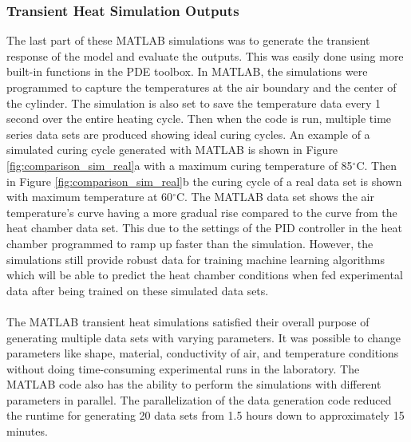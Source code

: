\subsubsection{Transient Heat Simulation Outputs}
The last part of these MATLAB simulations was to generate the transient response of the model and evaluate the outputs. This was easily done using more built-in functions in the PDE toolbox. In MATLAB, the simulations were programmed to capture the temperatures at the air boundary and the center of the cylinder. The simulation is also set to save the temperature data every 1 second over the entire heating cycle. Then when the code is run, multiple time series data sets are produced showing ideal curing cycles. An example of a simulated curing cycle generated with MATLAB is shown in Figure \ref{fig:comparison_sim_real}a with a maximum curing temperature of 85$^\circ$C. Then in Figure \ref{fig:comparison_sim_real}b the curing cycle of a real data set is shown with maximum temperature at 60$^\circ$C. The MATLAB data set shows the air temperature’s curve having a more gradual rise compared to the curve from the heat chamber data set. This due to the settings of the PID controller in the heat chamber programmed to ramp up faster than the simulation. However, the simulations still provide robust data for training machine learning algorithms which will be able to predict the heat chamber conditions when fed experimental data after being trained on these simulated data sets.\\\\
The MATLAB transient heat simulations satisfied their overall purpose of generating multiple data sets with varying parameters. It was possible to change parameters like shape, material, conductivity of air, and temperature conditions without doing time-consuming experimental runs in the laboratory. The MATLAB code also has the ability to perform the simulations with different parameters in parallel. The parallelization of the data generation code reduced the runtime for generating 20 data sets from 1.5 hours down to approximately 15 minutes. 

